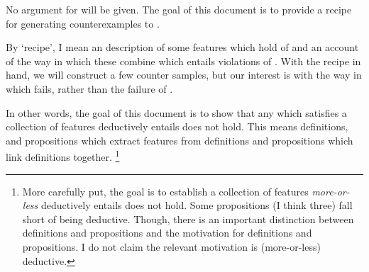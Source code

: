 \begin{note}
  No argument for \issueInclusion{} will be given.
  The goal of this document is to provide a recipe for generating counterexamples to \issueInclusion{}.

  By `recipe', I mean an description of some features which hold of  and an account of the way in which these combine which entails violations of \issueInclusion{}.
  With the recipe in hand, we will construct a few counter samples, but our interest is with the way in which \issueInclusion{} fails, rather than the failure of \issueInclusion{}.

  In other words, the goal of this document is to show that any  which satisfies a collection of features deductively entails \issueInclusion{} does not hold.
  This means definitions, and propositions which extract features from definitions and propositions which link definitions together.%
  \footnote{
    More carefully put, the goal is to establish a collection of features \emph{more-or-less} deductively entails \issueInclusion{} does not hold.
    Some propositions (I think three) fall short of being deductive.
    Though, there is an important distinction between definitions and propositions and the motivation for definitions and propositions.
    I do not claim the relevant motivation is (more-or-less) deductive.
  }








\end{note}

